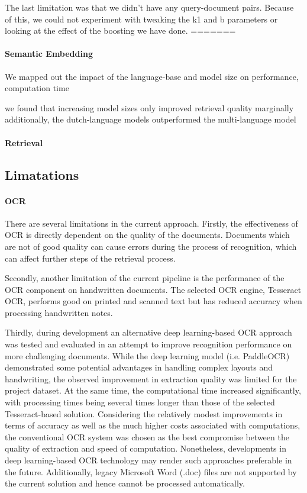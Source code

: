The last limitation was that we didn't have any query-document pairs. Because of this, we could not experiment with tweaking the k1 and b parameters or looking at the effect of the boosting we have done.
=======
\paragraph{Semantic Embedding}
We mapped out the impact of the language-base and model size on performance, computation time

we found that increasing model sizes only improved retrieval quality marginally
additionally, the dutch-language models outperformed the multi-language model


\paragraph{Retrieval}

\subsection{Limatations}

\paragraph{OCR} There are several limitations in the current approach. 
Firstly, the effectiveness of OCR is directly dependent on the quality of the documents. 
Documents which are not of good quality can cause errors during the process of recognition, which can affect further steps of the retrieval process.

Secondly, another limitation of the current pipeline is the performance of the OCR component on handwritten documents. 
The selected OCR engine, Tesseract OCR, performs good on printed and scanned text but has reduced accuracy when processing handwritten notes. 

Thirdly, during development an alternative deep learning-based OCR 	approach was tested and evaluated in an attempt to improve recognition performance on more challenging documents. 
While the deep learning model (i.e. PaddleOCR) demonstrated some potential advantages in handling complex layouts and handwriting, the observed improvement in extraction quality was limited for the project dataset. 
At the same time, the computational time increased significantly, with processing times being several times longer than those of the selected Tesseract-based solution. 
Considering the relatively modest improvements in terms of accuracy as well as the much higher costs associated with computations, the conventional OCR system was chosen as the best compromise between the quality of extraction and speed of computation. 
Nonetheless, developments in deep learning-based OCR technology may render such approaches preferable in the future.
Additionally, legacy Microsoft Word (.doc) files are not supported by the current solution and hence cannot be processed automatically.

